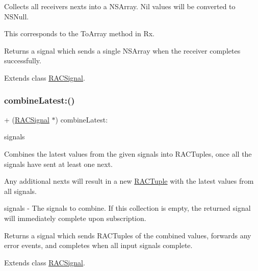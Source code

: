 Collects all receiver\textquotesingle{}s {\ttfamily next}s into a N\+S\+Array. Nil values will be converted to N\+S\+Null.

This corresponds to the {\ttfamily To\+Array} method in Rx.

Returns a signal which sends a single N\+S\+Array when the receiver completes successfully. 

Extends class \mbox{\hyperlink{interface_r_a_c_signal_a70b8f976dc0ece9b82e47cdb346a3a09}{R\+A\+C\+Signal}}.

\mbox{\label{category_r_a_c_signal_07_operations_08_a8a7a563a48665fb1203e2b37db6e5e98}} 
\subsubsection{\texorpdfstring{combine\+Latest\+:()}{combineLatest:()}\hspace{0.1cm}{\footnotesize\ttfamily [1/3]}}
{\footnotesize\ttfamily + (\mbox{\hyperlink{interface_r_a_c_signal}{R\+A\+C\+Signal}} $\ast$) combine\+Latest\+: \begin{DoxyParamCaption}\item[{(id$<$ N\+S\+Fast\+Enumeration $>$)}]{signals }\end{DoxyParamCaption}}

Combines the latest values from the given signals into R\+A\+C\+Tuples, once all the signals have sent at least one {\ttfamily next}.

Any additional {\ttfamily next}s will result in a new \mbox{\hyperlink{interface_r_a_c_tuple}{R\+A\+C\+Tuple}} with the latest values from all signals.

signals -\/ The signals to combine. If this collection is empty, the returned signal will immediately complete upon subscription.

Returns a signal which sends R\+A\+C\+Tuples of the combined values, forwards any {\ttfamily error} events, and completes when all input signals complete. 

Extends class \mbox{\hyperlink{interface_r_a_c_signal_a8a7a563a48665fb1203e2b37db6e5e98}{R\+A\+C\+Signal}}.

\mbox{\label{category_r_a_c_signal_07_operations_08_a8a7a563a48665fb1203e2b37db6e5e98}} 
